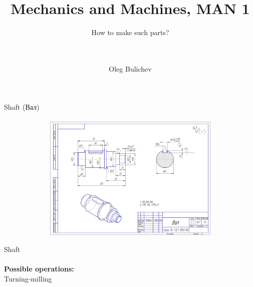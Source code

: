 \documentclass[aspectratio=169]{beamer}
\title[MaM]{Mechanics and Machines, MAN 1} %
\subtitle{How to make such parts?
\\ \  \\ \ 
    } %
\author{Oleg Bulichev}
\newcommand{\fbckg}[1]{\usebackgroundtemplate{\texttt{[image: \#1]}}}%
\begin{document}
\setlength{\abovedisplayskip}{0pt}
\setlength{\belowdisplayskip}{0pt}
\setlength{\abovedisplayshortskip}{0pt}
\setlength{\belowdisplayshortskip}{0pt}

\fbckg{fibeamer/figs/title_page.png}

\fbckg{fibeamer/figs/common.png}

\note{\scriptsize
\ 
}

\begin{frame}[c]{Shaft (Вал)}
\framesubtitle{}
    \vspace{-0.6cm}
    \begin{figure}[H]
        \centering\includegraphics[height=6cm,width=1\textwidth,keepaspectratio]{shaft.png}
        \label{fig:shaft.png}
    \end{figure}
\end{frame}

\begin{frame}[c]{Shaft}
\framesubtitle{}
    \LARGE \centering
    \textbf{Possible operations: } \\ 
    Turning-milling\\
\end{frame}
\end{document}
